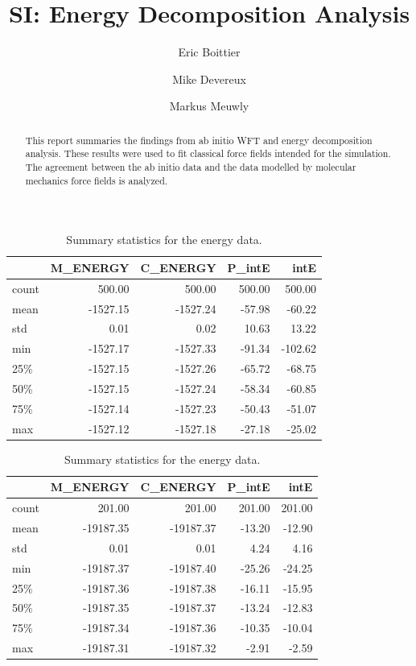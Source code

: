 \documentclass[journal=jacsat,manuscript=article]{achemso}
\author{Eric Boittier}
\author{Mike Devereux}
\author{Markus Meuwly}
\affiliation[University of Basel]
{Department of Chemistry, University of Basel, Switzerland}
\title[ Energy Decomposition Analysis ] { SI: Energy Decomposition Analysis }
\begin{document}
\begin{abstract}
 This report summaries the findings from 
ab initio WFT and energy decomposition analysis. These results were used to fit
classical force fields intended for the simulation. The agreement between 
the ab initio data and the data modelled by molecular mechanics force fields is analyzed.

\end{abstract}

\clearpage
\begin{table}[b!]
\centering
\caption{Summary statistics for the energy data.}
\label{tab:energy_stats}
\begin{tabular}{lrrrr}
\toprule
{} &  M\_ENERGY &  C\_ENERGY &  P\_intE &    intE \\
\midrule
count &    500.00 &    500.00 &  500.00 &  500.00 \\
mean  &  -1527.15 &  -1527.24 &  -57.98 &  -60.22 \\
std   &      0.01 &      0.02 &   10.63 &   13.22 \\
min   &  -1527.17 &  -1527.33 &  -91.34 & -102.62 \\
25\%   &  -1527.15 &  -1527.26 &  -65.72 &  -68.75 \\
50\%   &  -1527.15 &  -1527.24 &  -58.34 &  -60.85 \\
75\%   &  -1527.14 &  -1527.23 &  -50.43 &  -51.07 \\
max   &  -1527.12 &  -1527.18 &  -27.18 &  -25.02 \\
\bottomrule
\end{tabular}
\end{table}

\begin{table}[b!]
\centering
\caption{Summary statistics for the energy data.}
\label{tab:energy_stats}
\begin{tabular}{lrrrr}
\toprule
{} &  M\_ENERGY &  C\_ENERGY &  P\_intE &   intE \\
\midrule
count &    201.00 &    201.00 &  201.00 & 201.00 \\
mean  & -19187.35 & -19187.37 &  -13.20 & -12.90 \\
std   &      0.01 &      0.01 &    4.24 &   4.16 \\
min   & -19187.37 & -19187.40 &  -25.26 & -24.25 \\
25\%   & -19187.36 & -19187.38 &  -16.11 & -15.95 \\
50\%   & -19187.35 & -19187.37 &  -13.24 & -12.83 \\
75\%   & -19187.34 & -19187.36 &  -10.35 & -10.04 \\
max   & -19187.31 & -19187.32 &   -2.91 &  -2.59 \\
\bottomrule
\end{tabular}
\end{table}
\end{document}
